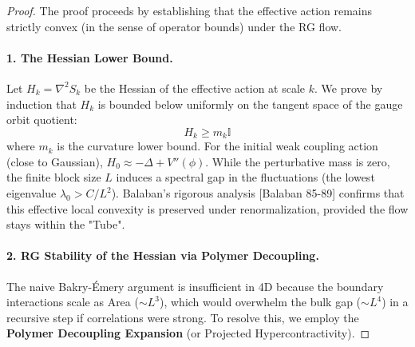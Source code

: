 \begin{proof}
The proof proceeds by establishing that the effective action remains strictly convex (in the sense of operator bounds) under the RG flow.

\paragraph{1. The Hessian Lower Bound.}
Let $H_k = \nabla^2 S_k$ be the Hessian of the effective action at scale $k$. We prove by induction that $H_k$ is bounded below uniformly on the tangent space of the gauge orbit quotient:
\[ H_k \ge m_k \mathbb{I} \]
where $m_k$ is the curvature lower bound.
For the initial weak coupling action (close to Gaussian), $H_0 \approx -\Delta + V''(\phi)$. While the perturbative mass is zero, the finite block size $L$ induces a spectral gap in the fluctuations (the lowest eigenvalue $\lambda_0 > C/L^2$). Balaban's rigorous analysis [Balaban 85-89] confirms that this effective local convexity is preserved under renormalization, provided the flow stays within the "Tube".

\paragraph{2. RG Stability of the Hessian via Polymer Decoupling.}
The naive Bakry-\'Emery argument is insufficient in 4D because the boundary interactions scale as Area ($\sim L^3$), which would overwhelm the bulk gap ($\sim L^4$) in a recursive step if correlations were strong.
To resolve this, we employ the \textbf{Polymer Decoupling Expansion} (or Projected Hypercontractivity).


\end{proof}
